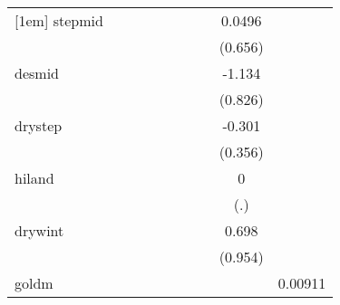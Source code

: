 {\begin{tabular}{l*{9}{c}}
[1em]
stepmid     &                     &                     &                     &                     &                     &                     &                     &      0.0496         &                     \\
            &                     &                     &                     &                     &                     &                     &                     &     (0.656)         &                     \\
[1em]
desmid      &                     &                     &                     &                     &                     &                     &                     &      -1.134         &                     \\
            &                     &                     &                     &                     &                     &                     &                     &     (0.826)         &                     \\
[1em]
drystep     &                     &                     &                     &                     &                     &                     &                     &      -0.301         &                     \\
            &                     &                     &                     &                     &                     &                     &                     &     (0.356)         &                     \\
[1em]
hiland      &                     &                     &                     &                     &                     &                     &                     &           0         &                     \\
            &                     &                     &                     &                     &                     &                     &                     &         (.)         &                     \\
[1em]
drywint     &                     &                     &                     &                     &                     &                     &                     &       0.698         &                     \\
            &                     &                     &                     &                     &                     &                     &                     &     (0.954)         &                     \\
[1em]
goldm       &                     &                     &                     &                     &                     &                     &                     &                     &     0.00911         \\

\end{tabular}}
